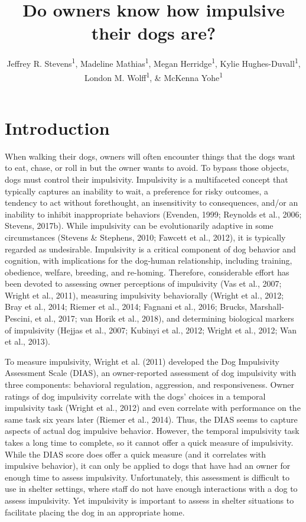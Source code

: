 \documentclass[
  pub,floatsintext]{apa6}
\title{Do owners know how impulsive their dogs are?}
\author{Jeffrey R. Stevens\textsuperscript{1}, Madeline Mathias\textsuperscript{1}, Megan Herridge\textsuperscript{1}, Kylie Hughes-Duvall\textsuperscript{1}, London M. Wolff\textsuperscript{1}, \& McKenna Yohe\textsuperscript{1}}
\date{}
\affiliation{\vspace{0.5cm}\textsuperscript{1} University of Nebraska-Lincoln}
\begin{document}
\maketitle

\hypertarget{introduction}{%
\section{Introduction}\label{introduction}}

When walking their dogs, owners will often encounter things that the dogs want to eat, chase, or roll in but the owner wants to avoid. To bypass those objects, dogs must control their impulsivity. Impulsivity is a multifaceted concept that typically captures an inability to wait, a preference for risky outcomes, a tendency to act without forethought, an insensitivity to consequences, and/or an inability to inhibit inappropriate behaviors (Evenden, 1999; Reynolds et al., 2006; Stevens, 2017b). While impulsivity can be evolutionarily adaptive in some circumstances (Stevens \& Stephens, 2010; Fawcett et al., 2012), it is typically regarded as undesirable. Impulsivity is a critical component of dog behavior and cognition, with implications for the dog-human relationship, including training, obedience, welfare, breeding, and re-homing. Therefore, considerable effort has been devoted to assessing owner perceptions of impulsivity (Vas et al., 2007; Wright et al., 2011), measuring impulsivity behaviorally (Wright et al., 2012; Bray et al., 2014; Riemer et al., 2014; Fagnani et al., 2016; Brucks, Marshall-Pescini, et al., 2017; van Horik et al., 2018), and determining biological markers of impulsivity (Hejjas et al., 2007; Kubinyi et al., 2012; Wright et al., 2012; Wan et al., 2013).

To measure impulsivity, Wright et al. (2011) developed the Dog Impulsivity Assessment Scale (DIAS), an owner-reported assessment of dog impulsivity with three components: behavioral regulation, aggression, and responsiveness. Owner ratings of dog impulsivity correlate with the dogs' choices in a temporal impulsivity task (Wright et al., 2012) and even correlate with performance on the same task six years later (Riemer et al., 2014). Thus, the DIAS seems to capture aspects of actual dog impulsive behavior. However, the temporal impulsivity task takes a long time to complete, so it cannot offer a quick measure of impulsivity. While the DIAS score does offer a quick measure (and it correlates with impulsive behavior), it can only be applied to dogs that have had an owner for enough time to assess impulsivity. Unfortunately, this assessment is difficult to use in shelter settings, where staff do not have enough interactions with a dog to assess impulsivity. Yet impulsivity is important to assess in shelter situations to facilitate placing the dog in an appropriate home.
\end{document}
